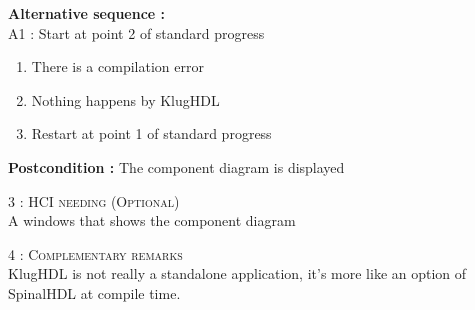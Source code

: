 \begin{flushleft}
    \textbf{\large  Alternative sequence :}\\
    A1 : Start at point 2 of standard progress
    \begin{enumerate}[nosep]
        \item There is a compilation error
        \item Nothing happens by KlugHDL
        \item Restart at point 1 of standard progress
    \end{enumerate}

    \textbf{\large Postcondition :} The component diagram is displayed

    \BlackLine
    \textsc{\Large 3 : HCI needing (Optional)}\\[0.3cm]

    A windows that shows the component diagram

    \BlackLine
    \textsc{\Large 4 : Complementary remarks}\\[0.3cm]

    KlugHDL is not really a standalone application, it's more like an option of
    SpinalHDL at compile time.

\end{flushleft}
